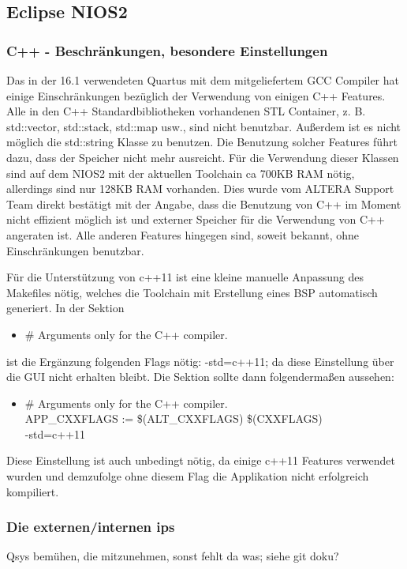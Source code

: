 \subsection{Eclipse NIOS2}
\subsubsection{C++ - Beschränkungen, besondere Einstellungen}
Das in der 16.1 verwendeten Quartus mit dem mitgeliefertem GCC Compiler hat einige Einschränkungen bezüglich der Verwendung von einigen C++ Features. Alle in den C++ Standardbibliotheken vorhandenen STL Container, z. B. std::vector, std::stack, std::map usw., sind nicht benutzbar. Außerdem ist es nicht möglich die std::string Klasse zu benutzen. Die Benutzung solcher Features führt dazu, dass der Speicher nicht mehr ausreicht. Für die Verwendung dieser Klassen sind auf dem NIOS2 mit der aktuellen Toolchain ca 700KB RAM nötig, allerdings sind nur 128KB RAM vorhanden. Dies wurde vom ALTERA Support Team direkt bestätigt mit der Angabe, dass die Benutzung von C++ im Moment nicht effizient möglich ist und externer Speicher für die Verwendung von C++ angeraten ist. Alle anderen Features hingegen sind, soweit bekannt, ohne Einschränkungen benutzbar.

Für die Unterstützung von c++11 ist eine kleine manuelle Anpassung des Makefiles nötig, welches die Toolchain mit Erstellung eines BSP automatisch generiert. In der Sektion
\begin{itemize}
 \item \# Arguments only for the C++ compiler.
\end{itemize}
ist die Ergänzung folgenden Flags nötig: -std=c++11; da diese Einstellung über die GUI nicht erhalten bleibt. Die Sektion sollte dann folgendermaßen aussehen:
\begin{itemize}
 \item \# Arguments only for the C++ compiler.\\APP\_CXXFLAGS := \$(ALT\_CXXFLAGS) \$(CXXFLAGS) \ \\-std=c++11
\end{itemize}
Diese Einstellung ist auch unbedingt nötig, da einige c++11 Features verwendet wurden und demzufolge ohne diesem Flag die Applikation nicht erfolgreich kompiliert.

\subsubsection{Die externen/internen ips}
Qsys bemühen, die mitzunehmen, sonst fehlt da was; siehe git doku?

